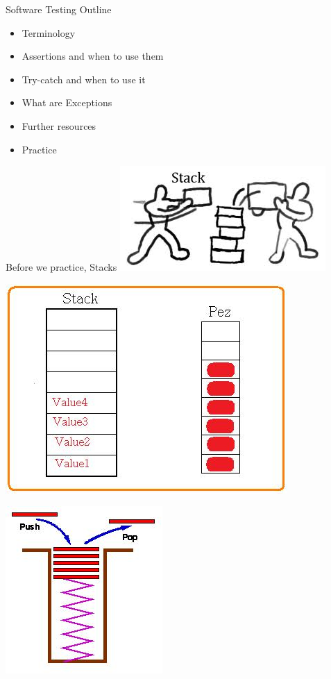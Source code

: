 \documentclass{beamer}
\begin{document}
\begin{frame}[fragile]{ Software Testing Outline}
\begin{itemize}
\item Terminology
\item Assertions and when to use them
\item Try-catch and when to use it
\item What are Exceptions
\item Further resources
\item Practice
\end{itemize}
\end{frame}


\begin{frame}[fragile]{ Before we practice, Stacks}
\includegraphics[scale=1.0]{images/stack.jpg}
\end{frame}


\begin{frame}[fragile]{ }
\includegraphics[scale=1.0]{images/pez.jpg}
\end{frame}


\begin{frame}[fragile]{ }
\includegraphics[scale=1.0]{images/stack1.jpg}
\end{frame}
\end{document}
